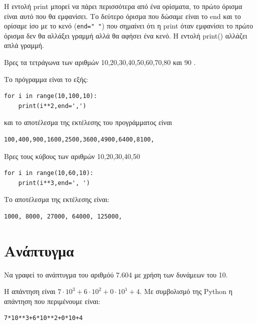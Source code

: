 \documentclass[b5paper,11pt,twoside,openleft]{memoir}
\begin{document}
Η εντολή print μπορεί να πάρει περισσότερα από ένα ορίσματα, το πρώτο όρισμα είναι αυτό που θα εμφανίσει. Το δεύτερο όρισμα που δώσαμε είναι το end και το ορίσαμε ίσο με το κενό (\lstinline{end=" "}) που σημαίνει ότι η print όταν εμφανίσει το πρώτο όρισμα δεν θα αλλάξει γραμμή αλλά θα αφήσει ένα κενό. Η εντολή print() αλλάζει απλά γραμμή.
\begin{exercise}
Βρες τα τετράγωνα των αριθμών 10,20,30,40,50,60,70,80 και 90 .
\end{exercise}
Το πρόγραμμα είναι το εξής:
\begin{lstlisting}
for i in range(10,100,10):
    print(i**2,end=',')
\end{lstlisting}
και το αποτέλεσμα της εκτέλεσης του προγράμματος είναι
\begin{lstlisting}
100,400,900,1600,2500,3600,4900,6400,8100,
\end{lstlisting}

\begin{exercise}
Βρες τους κύβους των αριθμών 10,20,30,40,50
\end{exercise}

\begin{lstlisting}
for i in range(10,60,10):
    print(i**3,end=', ')  
\end{lstlisting}
Το αποτέλεσμα της εκτέλεσης είναι:
\begin{lstlisting}
1000, 8000, 27000, 64000, 125000, 
\end{lstlisting}

\section{Ανάπτυγμα}
\begin{exercise}Να γραφεί το ανάπτυγμα του αριθμόύ 7.604 με χρήση των δυνάμεων του 10.
\end{exercise}
Η απάντηση είναι $7\cdot 10^3 + 6\cdot 10^2 + 0\cdot 10^1 + 4$.  Με συμβολισμό της Python η απάντηση που περιμένουμε είναι:
\begin{lstlisting}
7*10**3+6*10**2+0*10+4
\end{lstlisting}


\end{document}
